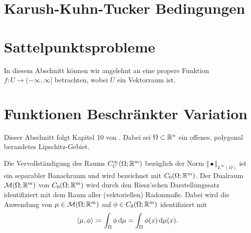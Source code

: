 \section{Karush-Kuhn-Tucker Bedingungen}

\section{Sattelpunktsprobleme}
In diesem Abschnitt können wir angelehnt an \cite[S. 4ff., S. 165ff.]{Aub79}
eine propere Funktion $f:U\to (-\infty,\infty]$ betrachten, wobei $U$ ein
Vektorraum ist.


\section{Funktionen Beschränkter Variation}

Dieser Abschnitt folgt Kapitel 10 von \cite{Bar15}.
Dabei sei $\Omega \subset \mathbb{R}^n$ ein offenes, polygonal berandetes
Lipschitz-Gebiet.

\begin{definition}
  Die Vervollständigung des Raums $C^\infty_C(\Omega;\mathbb{R}^m)$ bezüglich der 
  Norm
  $\Vert\bullet\Vert_{L^\infty(\Omega)}$ ist ein separabler Banachraum und wird
  bezeichnet mit 
  $C_0(\Omega; \mathbb{R}^m)$.
  Der Dualraum $\mathcal{M}(\Omega;\mathbb{R}^m)$ von $C_0(\Omega; \mathbb{R}^m)$ wird
  durch den Riesz'schen Darstellungssatz  identifiziert mit
  dem Raum aller (vektoriellen) Radonmaße. Dabei wird die Anwendung
  von $\mu\in \mathcal{M}(\Omega;\mathbb{R}^m)$
  auf $\phi\in C_0(\Omega;\mathbb{R}^m)$ identifiziert mit
  \begin{align*}
    \langle \mu, \phi\rangle \coloneqq \int_\Omega \phi \,\mathrm{d}\mu =
    \int_\Omega \phi(x) \,\mathrm{d}\mu(x).
  \end{align*}
\end{definition}

